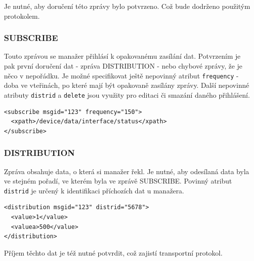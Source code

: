 Je nutné, aby doručení této zprávy bylo potvrzeno. Což bude dodrženo použitým protokolem.

\subsubsection*{SUBSCRIBE}
Touto zprávou se manažer přihlásí k opakovanému zasílání dat. Potvrzením je pak první doručení dat - zpráva DISTRIBUTION - nebo chybové zprávy, že je něco v nepořádku.
Je možné specifikovat ještě nepovinný atribut \verb|frequency| - doba ve vteřinách, po které mají být opakovaně zasílány zprávy. Další nepovinné atributy \verb|distrid| a \verb|delete|
jsou využity pro editaci či smazání daného přihlášení.

\begin{verbatim}
<subscribe msgid="123" frequency="150">
  <xpath>/device/data/interface/status</xpath>
</subscribe>
\end{verbatim}

\subsubsection*{DISTRIBUTION}
Zpráva obsahuje data, o která si manažer řekl. Je nutné, aby odesílaná data byla ve stejném pořadí, ve kterém byla ve zprávě SUBSCRIBE. 
Povinný atribut \verb|distrid| je určený k identifikaci příchozích dat u manažera.

\begin{verbatim}
<distribution msgid="123" distrid="5678">
  <value>1</value>
  <valuea>500</value>
</distribution>
\end{verbatim}

Příjem těchto dat je též nutné potvrdit, což zajistí transportní protokol.



